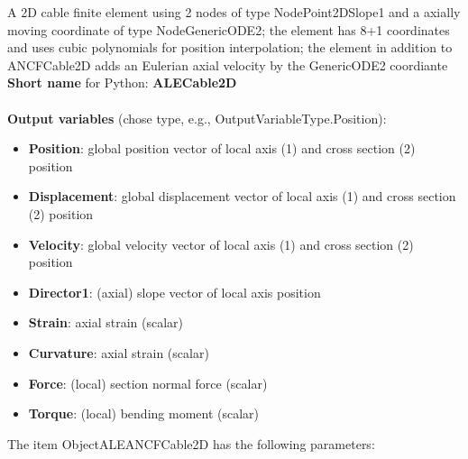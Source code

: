 A 2D cable finite element using 2 nodes of type NodePoint2DSlope1 and a axially moving coordinate of type NodeGenericODE2; the element has 8+1 coordinates and uses cubic polynomials for position interpolation; the element in addition to ANCFCable2D adds an Eulerian axial velocity by the GenericODE2 coordiante
 \\
{\bf Short name} for Python: {\bf ALECable2D}
 \\\\ 
{\bf Output variables} (chose type, e.g., OutputVariableType.Position): 
\begin{itemize}
    \item {\bf Position}: global position vector of local axis (1) and cross section (2) position
    \item {\bf Displacement}: global displacement vector of local axis (1) and cross section (2) position
    \item {\bf Velocity}: global velocity vector of local axis (1) and cross section (2) position
    \item {\bf Director1}: (axial) slope vector of local axis position
    \item {\bf Strain}: axial strain (scalar)
    \item {\bf Curvature}: axial strain (scalar)
    \item {\bf Force}: (local) section normal force (scalar)
    \item {\bf Torque}: (local) bending moment (scalar)
\end{itemize}
The item ObjectALEANCFCable2D has the following parameters:
